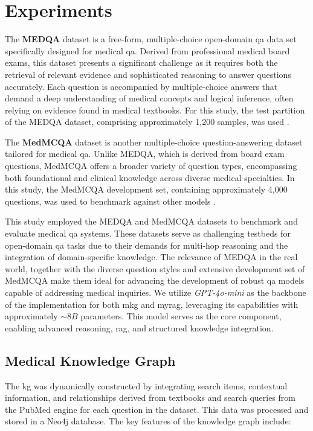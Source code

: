 \section{Experiments}


The \textbf{MEDQA} dataset is a free-form, multiple-choice open-domain \gls{qa} data set specifically designed for medical \gls{qa}. Derived from professional medical board exams, this dataset presents a significant challenge as it requires both the retrieval of relevant evidence and sophisticated reasoning to answer questions accurately. Each question is accompanied by multiple-choice answers that demand a deep understanding of medical concepts and logical inference, often relying on evidence found in medical textbooks. For this study, the test partition of the MEDQA dataset, comprising approximately 1,200 samples, was used \cite{jin2021disease}.

The \textbf{MedMCQA} dataset is another multiple-choice question-answering dataset tailored for medical \gls{qa}. Unlike MEDQA, which is derived from board exam questions, MedMCQA offers a broader variety of question types, encompassing both foundational and clinical knowledge across diverse medical specialties. In this study, the MedMCQA development set, containing approximately 4,000 questions, was used to benchmark against other models \cite{pmlr-v174-pal22a}.



This study employed the MEDQA and MedMCQA datasets to benchmark and evaluate medical \gls{qa} systems. These datasets serve as challenging testbeds for open-domain \gls{qa} tasks due to their demands for multi-hop reasoning and the integration of domain-specific knowledge. The relevance of MEDQA in the real world, together with the diverse question styles and extensive development set of MedMCQA make them ideal for advancing the development of robust \gls{qa} models capable of addressing medical inquiries. We utilize \textit{GPT-4o-mini} as the backbone of the implementation for both \gls{mkg} and \gls{myrag}, leveraging its capabilities with approximately \(\sim 8B\) parameters. This model serves as the core component, enabling advanced reasoning, \gls{rag}, and structured knowledge integration.


\subsection{Medical Knowledge Graph}
The \gls{kg} was dynamically constructed by integrating search items, contextual information, and relationships derived from textbooks and search queries from the PubMed engine for each question in the dataset. This data was processed and stored in a Neo4j database. The key features of the knowledge graph include:

